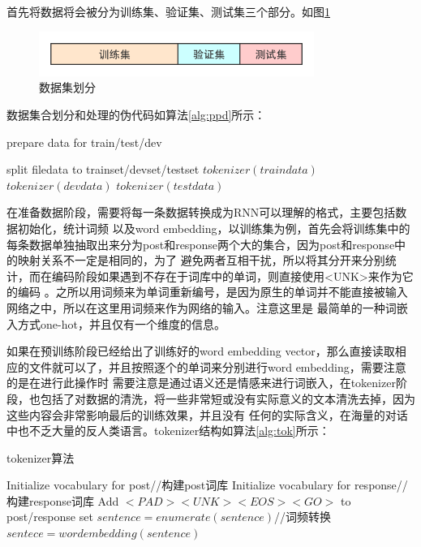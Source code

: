 \documentclass[supercite]{HustGraduPaper}
\theoremstyle{definition}
\begin{document}
首先将数据将会被分为训练集、验证集、测试集三个部分。如图\ref{Fig.data}
\begin{figure}[H] %
  \centering %
  \includegraphics[width=0.8\textwidth]{images/data.png} %
  \caption{数据集划分} %
  \label{Fig.data} %
\end{figure}
数据集合划分和处理的伪代码如算法\ref{alg:ppd}所示：
\begin{algorithm}
  \caption{prepare data for train/test/dev}
  \label{alg:ppd}
  \begin{algorithmic}
    \State split filedata to trainset/devset/testset
      \State $tokenizer(traindata)$
    \EndFor
      \State $tokenizer(devdata)$
    \EndFor
      \State $tokenizer(testdata)$
    \EndFor
  \end{algorithmic}
\end{algorithm}


在准备数据阶段，需要将每一条数据转换成为RNN可以理解的格式，主要包括数据初始化，统计词频
以及word embedding，以训练集为例，首先会将训练集中的每条数据单独抽取出来分为post和response两个大的集合，因为post和response中的映射关系不一定是相同的，为了
避免两者互相干扰，所以将其分开来分别统计，而在编码阶段如果遇到不存在于词库中的单词，则直接使用<UNK>来作为它的编码
。之所以用词频来为单词重新编号，是因为原生的单词并不能直接被输入网络之中，所以在这里用词频来作为网络的输入。注意这里是
最简单的一种词嵌入方式one-hot，并且仅有一个维度的信息。

如果在预训练阶段已经给出了训练好的word embedding vector，那么直接读取相应的文件就可以了，并且按照逐个的单词来分别进行word embedding，需要注意的是在进行此操作时
需要注意是通过语义还是情感来进行词嵌入，在tokenizer阶段，也包括了对数据的清洗，将一些非常短或没有实际意义的文本清洗去掉，因为这些内容会非常影响最后的训练效果，并且没有
任何的实际含义，在海量的对话中也不乏大量的反人类语言。tokenizer结构如算法\ref{alg:tok}所示：
\begin{algorithm}
  \caption{tokenizer算法}
  \label{alg:tok}
  \begin{algorithmic}
      \State Initialize vocabulary for post//构建post词库
      \State Initialize vocabulary for response//构建response词库
      \State Add $<PAD> <UNK> <EOS> <GO> $ to post/response set
    \EndFor
        \State $sentence =  enumerate(sentence)$//词频转换
        \State $sentece = wordembedding(sentence)$
    \EndFor
  \end{algorithmic}
\end{algorithm}
\end{document}
